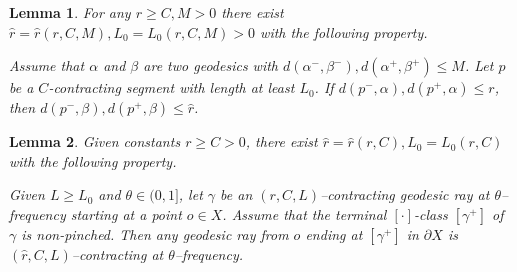 \documentclass[10pt,a4paper]{amsart}
\newtheorem{lem}{Lemma}
\newcommand{\U}{ X}
\newcommand{\pU}{\partial{  X}}
\begin{document}
\begin{lem}\label{close barriers in two geodesics}
For any $r\ge C,M>0$ there exist $\hat r=\hat r(r,C,M), L_0=L_0(r,C,M)>0$ with the following property.

Assume that $\alpha$ and $\beta$ are two geodesics with $d(\alpha^-,\beta^-), d(\alpha^+,\beta^+)\le M$. Let $p$ be a $C$-contracting segment with length at least $L_0$. If  $d(p^-,\alpha),d(p^+,\alpha)\le r$, then $d(p^-,\beta),d(p^+,\beta)\le \hat r$.    
\end{lem}

\begin{lem}\label{RegContrRayClass}
Given constants $r\ge C>0$, there exist $\hat r=\hat r(r,C), L_0=L_0(r,C)$ with the following property.

Given $L\ge L_0$ and $\theta\in (0,1]$, let $\gamma$  be an $(r, C, L)$--contracting  geodesic ray  at $\theta$–frequency starting at a point $o\in \U$. Assume that the terminal $[\cdot]$-class $[\gamma^+]$ of  $\gamma$ is non-pinched. Then any geodesic ray from $o$ ending at $[\gamma^+]$ in $\pU$ is $(\hat r, C, L)$--contracting   at $\theta$–frequency.
\end{lem}
\end{document}
